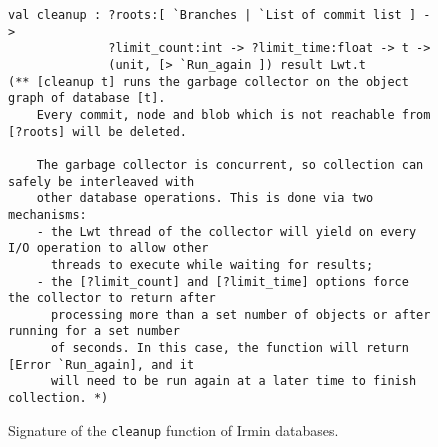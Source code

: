 \begin{figure}[ht]
  \caption{Signature of the \texttt{cleanup} function of Irmin databases.}
  \label{lst:cleanup-sig}

  \centering
  \vspace{-1em}
  \begin{verbatim}
val cleanup : ?roots:[ `Branches | `List of commit list ] ->
              ?limit_count:int -> ?limit_time:float -> t ->
              (unit, [> `Run_again ]) result Lwt.t
(** [cleanup t] runs the garbage collector on the object graph of database [t].
    Every commit, node and blob which is not reachable from [?roots] will be deleted.

    The garbage collector is concurrent, so collection can safely be interleaved with
    other database operations. This is done via two mechanisms:
    - the Lwt thread of the collector will yield on every I/O operation to allow other
      threads to execute while waiting for results;
    - the [?limit_count] and [?limit_time] options force the collector to return after
      processing more than a set number of objects or after running for a set number 
      of seconds. In this case, the function will return [Error `Run_again], and it
      will need to be run again at a later time to finish collection. *)
    \end{verbatim}
\end{figure}
